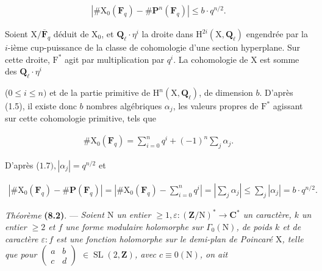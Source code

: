 \documentclass[10pt,leqno]{article}
\begin{document}
\begin{equation*}\begin{gathered}|\# \mathrm{X}_{0}(\mathbf{F}_{q})- \# \mathbf{P}^{n}(\mathbf{F}_{q})| \leq  b\cdot q^{n/2}.\end{gathered}\end{equation*}

\noindent Soient \(\mathrm{X}/\overline{\mathbf{F}}_{q}\) déduit de \(\mathrm{X}_{0}\), et \(\mathbf{Q}_{\ell }\cdot \eta ^{i}\) la droite dans \(\mathrm{H}^{2i}(\mathrm{X},\mathbf{Q}_{\ell })\) engendrée par la \(i\)-ième cup-puissance de la classe de cohomologie d’une section hyperplane. Sur cette droite, \(\mathrm{F}^{*}\) agit par multiplication par \(q^{i}\). La cohomologie de \(\mathrm{X}\) est somme des \(\mathbf{Q}_{\ell }\cdot \eta ^{i}\)\par

\clearpage

\label{physical-31}\par\smallskip

\noindent (\(0 \leq  i \leq  n)\) et de la partie primitive de \(\mathrm{H}^{n}(\mathrm{X}, \mathbf{Q}_{\ell })\), de dimension \(b\). D'après (1.5), il existe donc \(b\) nombres algébriques \(\alpha _{j}\), les valeurs propres de \(\mathrm{F}^{*}\) agissant sur cette cohomologie primitive, tels que\par

\begin{equation*}\begin{gathered}\# \mathrm{X}_{0}(\mathbf{F}_{q}) = \sum _{i=0}^{n} q^{i} + (-1)^{n} \sum _{j} \alpha _{j}.\end{gathered}\end{equation*}

\noindent D'après (\(1.7), |\alpha _{j}| = q^{n/2}\) et\par

\begin{equation*}\begin{gathered}|\# \mathrm{X}_{0}(\mathbf{F}_{q}) - \# \mathbf{P}(\mathbf{F}_{q})| = |\# \mathrm{X}_{0}(\mathbf{F}_{q}) - \sum _{i=0}^{n} q^{i}| = |\sum _{j} \alpha _{j}| \leq  \sum _{j} |\alpha _{j}| = b\cdot q^{n/2}.\end{gathered}\end{equation*}

\noindent \emph{Théorème} \textbf{(8.2)}. — {\itshape Soient \(\mathrm{N}\) un entier \(\geq  1, \varepsilon  : (\mathbf{Z}/\mathrm{N})^{*} \longrightarrow  \mathbf{C}^{*}\) un caractère, \(k\) un entier \(\geq  2\) et \(f\) une forme modulaire holomorphe sur \(\Gamma _{0}(\mathrm{N})\), de poids \(k\) et de caractère \(\varepsilon  : f\) est une fonction holomorphe sur le demi-plan de Poincaré \(\mathrm{X}\), telle que pour \(\begin{pmatrix}a&b\\c&d\end{pmatrix}\) \(\in  \operatorname{SL}(2, \mathbf{Z})\), avec \(c \equiv  0 (\mathrm{N})\), on ait}\par
\end{document}
